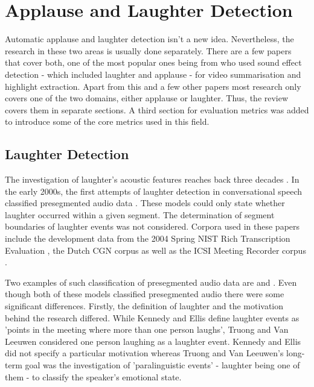 \documentclass[bsc,frontabs,parskip,deptreport]{infthesis}
\begin{document}
\chapter{Applause and Laughter Detection} \label{cha:bg}
Automatic applause and laughter detection isn't a new idea. Nevertheless, the research in these two areas is usually done separately. There are a few papers that cover both, one of the most popular ones being from \citet{cai2003highlight} who used sound effect detection - which included laughter and applause - for video summarisation and highlight extraction.
Apart from this and a few other papers most research only covers one of the two domains, either applause or laughter. Thus, the review covers them in separate sections. A third section for evaluation metrics was added to introduce some of the core metrics used in this field. 

\section{Laughter Detection} \label{sec:bg-laughter}
The investigation of laughter's acoustic features reaches back three decades \citep{bickley1992acoustic}.
In the early 2000s, the first attempts of laughter detection in conversational speech classified presegmented audio data \citep{kennedy2004laughter, truong2005automatic}. These models could only state whether laughter occurred within a given segment. The determination of segment boundaries of laughter events was not considered. 
Corpora used in these papers include the development data from the 2004 Spring NIST Rich Transcription Evaluation \citep{nist-recordings}, the Dutch CGN corpus \citep{oostdijk2000spoken} as well as the ICSI Meeting Recorder corpus \citep{morgan2001meeting}. 

Two examples of such classification of presegmented audio data are \citet{kennedy2004laughter} and \citet{truong2005automatic}. 
Even though both of these models classified presegmented audio there were some significant differences. 
Firstly, the definition of laughter and the motivation behind the research differed.
While Kennedy and Ellis define laughter events as 'points in the meeting where more than one person laughs', Truong and Van Leeuwen considered one person laughing as a laughter event.
Kennedy and Ellis did not specify a particular motivation whereas Truong and Van Leeuwen's long-term goal was the investigation of 'paralinguistic events' - laughter being one of them - to classify the speaker's emotional state.   
\end{document}
